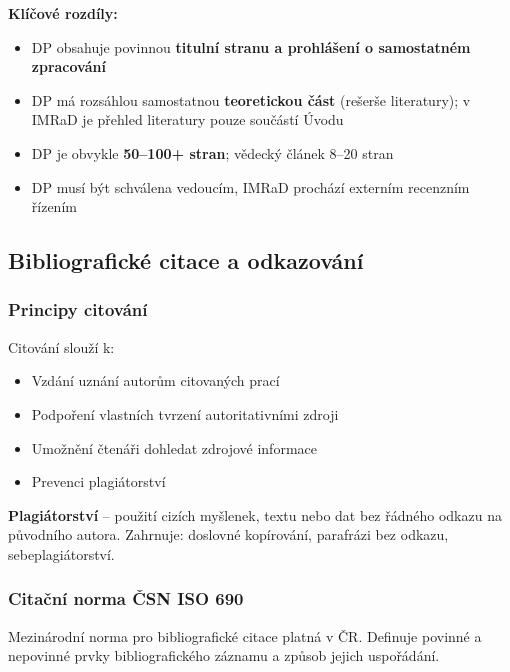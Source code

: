 \textbf{Klíčové rozdíly:}
\begin{itemize}
  \item DP obsahuje povinnou \textbf{titulní stranu a prohlášení o samostatném zpracování}
  \item DP má rozsáhlou samostatnou \textbf{teoretickou část} (rešerše literatury); v IMRaD je přehled literatury pouze součástí Úvodu
  \item DP je obvykle \textbf{50--100+ stran}; vědecký článek 8--20 stran
  \item DP musí být schválena vedoucím, IMRaD prochází externím recenzním řízením
\end{itemize}

\subsection{Bibliografické citace a odkazování}

\subsubsection{Principy citování}

Citování slouží k:
\begin{itemize}
  \item Vzdání uznání autorům citovaných prací
  \item Podpoření vlastních tvrzení autoritativními zdroji
  \item Umožnění čtenáři dohledat zdrojové informace
  \item Prevenci plagiátorství
\end{itemize}

\textbf{Plagiátorství} -- použití cizích myšlenek, textu nebo dat bez řádného odkazu na původního autora.
Zahrnuje: doslovné kopírování, parafrázi bez odkazu, sebeplagiátorství.

\subsubsection{Citační norma ČSN ISO 690}

Mezinárodní norma pro bibliografické citace platná v ČR. Definuje povinné a nepovinné prvky
bibliografického záznamu a způsob jejich uspořádání.

